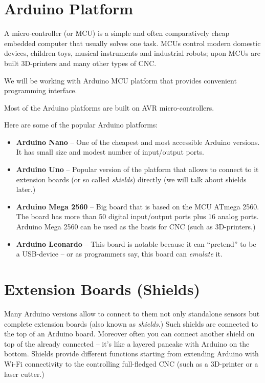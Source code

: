 \documentclass[../sparc.tex]{subfiles}
\begin{document}
\section{Arduino Platform}


A micro-controller (or \gls{MCU}) is a simple and often comparatively cheap
embedded computer that usually solves one task.  MCUs control modern domestic
devices, children toys, musical instruments and industrial robots; upon MCUs are
built 3D-printers and many other types of \gls{CNC}.

We will be working with Arduino MCU platform that provides convenient
programming interface.

Most of the Arduino platforms are built on AVR micro-controllers.

Here are some of the popular Arduino platforms:
\begin{itemize}
\item \textbf{Arduino Nano} -- One of the cheapest and most accessible Arduino versions.  It has small size and modest number of input/output ports.
\item \textbf{Arduino Uno} -- Popular version of the platform that allows to
  connect to it extension boards (or so called \emph{shields}) directly (we will
  talk about shields later.)
\item \textbf{Arduino Mega 2560} -- Big board that is based on the MCU ATmega
  2560.  The board has more than 50 digital input/output ports plus 16 analog
  ports.  Arduino Mega 2560 can be used as the basis for CNC (such as
  3D-printers.)
\item \textbf{Arduino Leonardo} -- This board is notable because it can
  ``pretend'' to be a USB-device -- or as programmers say, this board can
  \emph{emulate} it.
\end{itemize}

\section{Extension Boards (Shields)}

Many Arduino versions allow to connect to them not only standalone sensors but
complete extension boards (also known as \emph{shields}.)  Such shields are
connected to the top of an Arduino board.  Moreover often you can connect
another shield on top of the already connected -- it's like a layered pancake
with Arduino on the bottom.  Shields provide different functions starting from
extending Arduino with Wi-Fi connectivity to the controlling full-fledged
\gls{CNC} (such as a 3D-printer or a laser cutter.)
\end{document}
